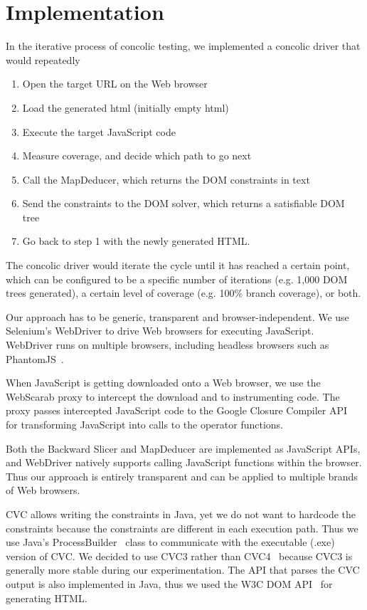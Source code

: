 \section{Implementation}
\label{impl}
In the iterative process of concolic testing, we implemented a concolic driver that would repeatedly
\begin {enumerate}
\item Open the target URL on the Web browser
\item Load the generated html (initially empty html)
\item Execute the target JavaScript code
\item Measure coverage, and decide which path to go next
\item Call the MapDeducer, which returns the DOM constraints in text
\item Send the constraints to the DOM solver, which returns a satisfiable DOM tree
\item Go back to step 1 with the newly generated HTML.
\end{enumerate}
The concolic driver would iterate the cycle until it has reached a certain point, which can be configured to be a specific number of iterations (e.g. 1,000 DOM trees generated), a certain level of coverage (e.g. 100\% branch coverage), or both. 


Our approach has to be generic, transparent and browser-independent.  
We use Selenium's WebDriver\cite{webdriverjs} to drive Web browsers for executing JavaScript.  WebDriver runs on multiple browsers, including headless browsers such as PhantomJS~\cite{phantomjs}.  

When JavaScript is getting downloaded onto a Web browser, we use the WebScarab proxy to intercept the download and to instrumenting code.  
The proxy passes intercepted JavaScript code to the Google Closure Compiler API~\cite{ClosureCompiler} for transforming JavaScript into calls to the operator functions. 

Both the Backward Slicer and MapDeducer are implemented as JavaScript APIs, and WebDriver natively supports calling JavaScript functions within the browser.  
Thus our approach is entirely transparent and can be applied to multiple brands of Web browsers.    


CVC allows writing the constraints in Java, yet we do not want to hardcode the constraints because the constraints are different in each execution path.  
Thus we use Java's ProcessBuilder~\cite{processbuilder} class to communicate with the executable (.exe) version of CVC.  We decided to use CVC3 rather than CVC4~\cite{cvc4} because CVC3 is generally more stable during our experimentation.  
The API that parses the CVC output is also implemented in Java, thus we used the W3C DOM API~\cite{DomAPI} for generating HTML.  


